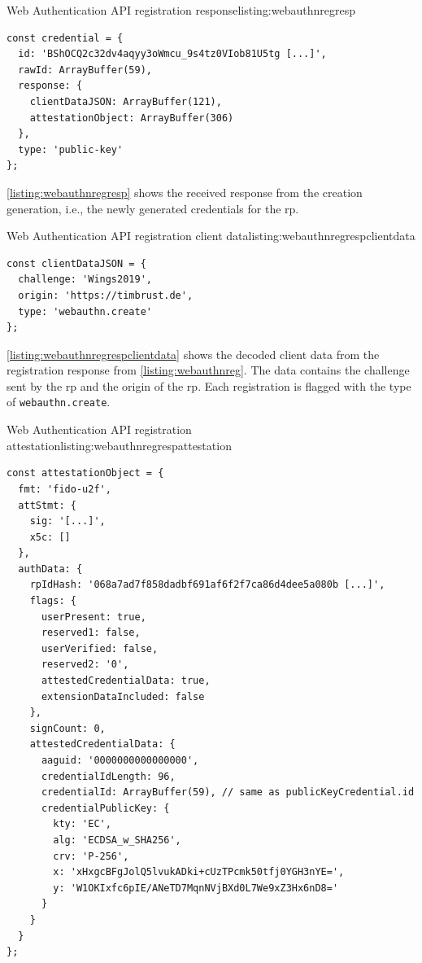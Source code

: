 \begin{example}{Web Authentication API registration response}{listing:webauthnregresp}
\begin{verbatim}
const credential = {
  id: 'BShOCQ2c32dv4aqyy3oWmcu_9s4tz0VIob81U5tg [...]',
  rawId: ArrayBuffer(59),
  response: {
    clientDataJSON: ArrayBuffer(121),
    attestationObject: ArrayBuffer(306)
  },
  type: 'public-key'
};
\end{verbatim}
\end{example}

\autoref{listing:webauthnregresp} shows the received response from the creation generation, i.e., the newly generated credentials for the \gls{rp}.

\begin{example}{Web Authentication API registration client data}{listing:webauthnregrespclientdata}
\begin{verbatim}
const clientDataJSON = {
  challenge: 'Wings2019',
  origin: 'https://timbrust.de',
  type: 'webauthn.create'
};
\end{verbatim}
\end{example}

\autoref{listing:webauthnregrespclientdata} shows the decoded client data from the \wa{} registration response from \autoref{listing:webauthnreg}. The data contains the challenge sent by the \gls{rp} and the origin of the \gls{rp}. Each registration is flagged with the type of \texttt{webauthn.create}.

\begin{example}{Web Authentication API registration attestation}{listing:webauthnregrespattestation}
\begin{verbatim}
const attestationObject = {
  fmt: 'fido-u2f',
  attStmt: {
    sig: '[...]',
    x5c: []
  },
  authData: {
    rpIdHash: '068a7ad7f858dadbf691af6f2f7ca86d4dee5a080b [...]',
    flags: {
      userPresent: true,
      reserved1: false,
      userVerified: false,
      reserved2: '0',
      attestedCredentialData: true,
      extensionDataIncluded: false
    },
    signCount: 0,
    attestedCredentialData: {
      aaguid: '0000000000000000',
      credentialIdLength: 96,
      credentialId: ArrayBuffer(59), // same as publicKeyCredential.id
      credentialPublicKey: {
        kty: 'EC',
        alg: 'ECDSA_w_SHA256',
        crv: 'P-256',
        x: 'xHxgcBFgJolQ5lvukADki+cUzTPcmk50tfj0YGH3nYE=',
        y: 'W1OKIxfc6pIE/ANeTD7MqnNVjBXd0L7We9xZ3Hx6nD8='
      }
    }
  }
};
\end{verbatim}
\end{example}

